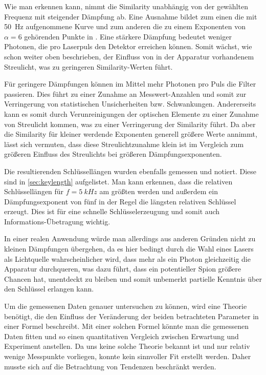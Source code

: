 Wie man erkennen kann, nimmt die Similarity unabhängig von der gewählten
Frequenz mit steigender Dämpfung ab. Eine Ausnahme bildet zum einen die mit
\SI{50}{Hz} aufgenommene Kurve und zum anderen die zu einem Exponenten von $α=6$
gehörenden Punkte in . Eine stärkere Dämpfung bedeutet weniger
Photonen, die pro Laserpuls den Detektor erreichen können. Somit wächst, wie
schon weiter oben beschrieben, der Einfluss von in der Apparatur vorhandenem
Streulicht, was zu geringeren Similarity-Werten führt.

Für geringere Dämpfungen können im Mittel mehr Photonen pro Puls die Filter
passieren. Dies führt zu einer Zunahme an Messwert-Anzahlen und somit zur
Verringerung von statistischen Unsicherheiten bzw. Schwankungen. Andererseits
kann es somit durch Verunreinigungen der optischen Elemente zu einer Zunahme
von Streulicht kommen, was zu einer Verringerung der Similarity führt. Da aber
die Similarity für kleiner werdende Exponenten generell größere Werte annimmt,
lässt sich vermuten, dass diese Streulichtzunahme klein ist im Vergleich zum
größeren Einfluss des Streulichts bei größeren Dämpfungsexponenten.

Die resultierenden Schlüssellängen wurden ebenfalls gemessen und notiert. Diese
sind in \ref{sec:keylength} aufgelistet. Man kann erkennen, dass die relativen 
Schlüssellängen für $f=\SI{5}{kHz}$ am größten werden und außerdem ein
Dämpfungsexponent von fünf in der Regel die längsten relativen Schlüssel erzeugt.
Dies ist für eine schnelle Schlüsselerzeugung und somit auch
Informations-Übetragung wichtig.

In einer realen Anwendung würde man allerdings aus anderen Gründen nicht zu
kleinen Dämpfungen übergehen, da es hier bedingt durch die Wahl
eines Lasers als Lichtquelle wahrscheinlicher wird, dass mehr als ein Photon
gleichzeitig die Apparatur durchqueren, was dazu führt, dass ein potentieller
Spion größere Chancen hat, unentdeckt zu bleiben und somit unbemerkt partielle
Kenntnis über den Schlüssel erlangen kann.

Um die gemessenen Daten genauer untersuchen zu können, wird eine Theorie
benötigt, die den Einfluss der Veränderung der beiden betrachteten Parameter in
einer Formel beschreibt. Mit einer solchen Formel könnte man die gemessenen
Daten fitten und so einen quantitativen Vergleich zwischen Erwartung und
Experiment anstellen. Da uns keine solche Theorie bekannt ist und nur relativ
wenige Messpunkte vorliegen, konnte kein sinnvoller Fit erstellt werden. Daher
musste sich auf die Betrachtung von Tendenzen beschränkt werden.

